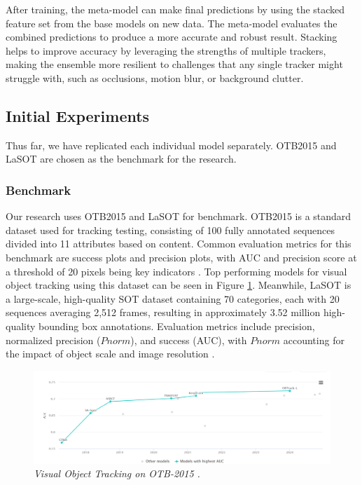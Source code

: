 \documentclass[11pt, letterpaper]{article}
\begin{document}
After training, the meta-model can make final predictions by using the stacked feature set from the base models on new data. The meta-model evaluates the combined predictions to produce a more accurate and robust result. Stacking helps to improve accuracy by leveraging the strengths of multiple trackers, making the ensemble more resilient to challenges that any single tracker might struggle with, such as occlusions, motion blur, or background clutter.

\subsection{Initial Experiments}

Thus far, we have replicated each individual model separately. OTB2015 and LaSOT are chosen as the benchmark for the research.

\subsubsection{Benchmark}

Our research uses OTB2015 and LaSOT for benchmark. OTB2015 is a standard dataset used for tracking testing, consisting of 100 fully annotated sequences divided into 11 attributes based on content. Common evaluation metrics for this benchmark are success plots and precision plots, with AUC and precision score at a threshold of 20 pixels being key indicators \cite{otb_2015_papers_nodate}. Top performing models for visual object tracking using this dataset can be seen in Figure \ref{fig:otb2015}. Meanwhile, LaSOT is a large-scale, high-quality SOT dataset containing 70 categories, each with 20 sequences averaging 2,512 frames, resulting in approximately 3.52 million high-quality bounding box annotations. Evaluation metrics include precision, normalized precision ($Pnorm$), and success (AUC), with $Pnorm$ accounting for the impact of object scale and image resolution \cite{lasot_papers_nodate}.

\begin{figure}
  \centering
  \includegraphics[width=1\linewidth]{img/otb2015.png}
  \caption{\label{fig:otb2015}\textit{Visual Object Tracking on OTB-2015 \cite{otb_2015_papers_nodate}.}}
\end{figure}
\end{document}
